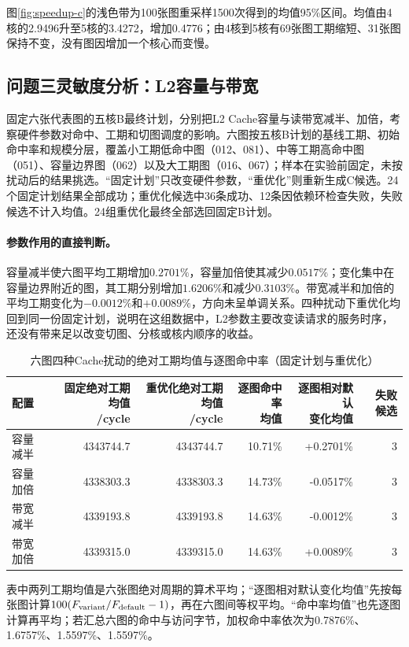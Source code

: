 图\ref{fig:speedup-c}的浅色带为100张图重采样1500次得到的均值95\%区间。均值由4核的2.9496升至5核的3.4272，增加0.4776；由4核到5核有69张图工期缩短、31张图保持不变，没有图因增加一个核心而变慢。

\subsection{问题三灵敏度分析：L2容量与带宽}
固定六张代表图的五核B最终计划，分别把L2 Cache容量与读带宽减半、加倍，考察硬件参数对命中、工期和切图调度的影响。六图按五核B计划的基线工期、初始命中率和规模分层，覆盖小工期低命中图（012、081）、中等工期高命中图（051）、容量边界图（062）以及大工期图（016、067）；样本在实验前固定，未按扰动后的结果挑选。“固定计划”只改变硬件参数，“重优化”则重新生成C候选。24个固定计划结果全部成功；重优化候选中36条成功、12条因依赖环检查失败，失败候选不计入均值。24组重优化最终全部选回固定B计划。
\paragraph{参数作用的直接判断。}容量减半使六图平均工期增加$0.2701\%$，容量加倍使其减少$0.0517\%$；变化集中在容量边界附近的图，其工期分别增加$1.6206\%$和减少$0.3103\%$。带宽减半和加倍的平均工期变化为$-0.0012\%$和$+0.0089\%$，方向未呈单调关系。四种扰动下重优化均回到同一份固定计划，说明在这组数据中，L2参数主要改变读请求的服务时序，还没有带来足以改变切图、分核或核内顺序的收益。
\begin{table}[H]\centering\small\caption{六图四种Cache扰动的绝对工期均值与逐图命中率（固定计划与重优化）}\label{tab:cache-sensitivity}
\begin{tabular}{lrrrrr}\toprule
配置 & \shortstack{固定绝对工期均值\\/cycle} & \shortstack{重优化绝对工期均值\\/cycle} & \shortstack{逐图命中率\\均值} & \shortstack{逐图相对默认\\变化均值} & 失败候选\\\midrule
容量减半 & 4343744.7 & 4343744.7 & 10.71\% & +0.2701\% & 3\\
容量加倍 & 4338303.3 & 4338303.3 & 14.73\% & -0.0517\% & 3\\
带宽减半 & 4339193.8 & 4339193.8 & 14.63\% & -0.0012\% & 3\\
带宽加倍 & 4339315.0 & 4339315.0 & 14.63\% & +0.0089\% & 3\\\bottomrule
\end{tabular}\end{table}
表中两列工期均值是六张图绝对周期的算术平均；“逐图相对默认变化均值”先按每张图计算$100(F_{\rm variant}/F_{\rm default}-1)$，再在六图间等权平均。“命中率均值”也先逐图计算再平均；若汇总六图的命中与访问字节，加权命中率依次为0.7876\%、1.6757\%、1.5597\%、1.5597\%。


